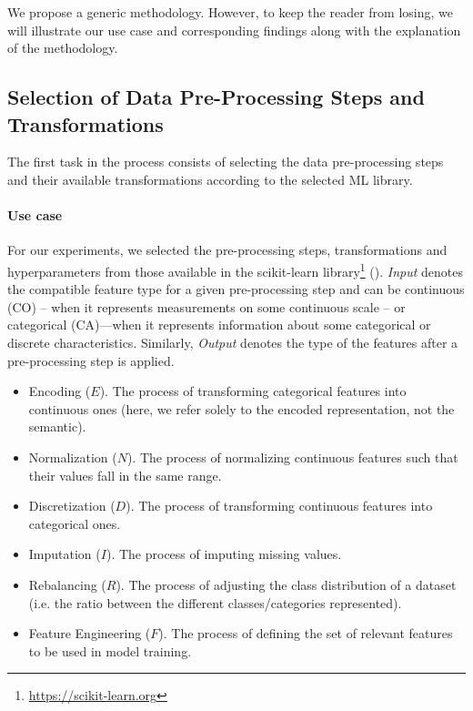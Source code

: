We propose a generic methodology.
However, to keep the reader from losing, we will illustrate our use case and corresponding findings along with the explanation of the methodology.

\subsection{Selection of Data Pre-Processing Steps and Transformations}
\label{effective-ssec:select-framework}

The first task in the process consists of selecting the data pre-processing steps and their available transformations according to the selected ML library.

\paragraph{Use case}
For our experiments, we selected the pre-processing steps, transformations and hyperparameters from those available in the scikit-learn library\footnote{\url{https://scikit-learn.org}} ().
\textit{Input} denotes the compatible feature type for a given pre-processing step and can be continuous (CO) -- when it represents measurements on some continuous scale -- or categorical (CA)---when it represents information about some categorical or discrete characteristics.
Similarly, \textit{Output} denotes the type of the features after a pre-processing step is applied.

\begin{itemize}[noitemsep,topsep=0pt]
\item{Encoding ($E$).} The process of transforming categorical features into continuous ones (here, we refer solely to the encoded representation, not the semantic).
\item{Normalization ($N$).} The process of normalizing continuous features such that their values fall in the same range.
\item{Discretization ($D$).} The process of transforming continuous features into categorical ones.
\item{Imputation ($I$).} The process of imputing missing values.
\item{Rebalancing ($R$).} The process of adjusting the class distribution of a dataset (i.e. the ratio between the different classes/categories represented).
\item{Feature Engineering ($F$).} The process of defining the set of relevant features to be used in model training.
\end{itemize}

